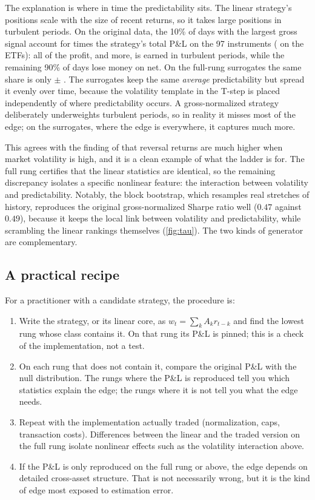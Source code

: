 \documentclass[11pt]{article}
\theoremstyle{definition}
\theoremstyle{remark}
\begin{document}
The explanation is where in time the predictability sits. The linear strategy's positions scale with the size of recent returns, so it takes large positions in turbulent
periods. On the original data, the 10\% of days with the largest gross signal account for \concOrigAll{} times the strategy's total P\&L on the 97 instruments
(\concOrigEtf{} on the ETFs): all of the profit, and more, is earned in turbulent periods, while the remaining 90\% of days lose money on net. On the full-rung surrogates
the same share is only \concSynAll{} $\pm$ \concSynSdAll{}. The surrogates keep the same \emph{average} predictability but spread it evenly over time, because the
volatility template in the T-step is placed independently of where predictability occurs. A gross-normalized strategy deliberately underweights turbulent periods, so in
reality it misses most of the edge; on the surrogates, where the edge is everywhere, it captures much more.

This agrees with the finding of \citet{nagel2012} that reversal returns are much higher when market volatility is high, and it is a clean example of what the ladder is
for. The full rung certifies that the linear statistics are identical, so the remaining discrepancy isolates a specific nonlinear feature: the interaction between
volatility and predictability. Notably, the block bootstrap, which resamples real stretches of history, reproduces the original gross-normalized Sharpe ratio well
($0.47$ against $0.49$), because it keeps the local link between volatility and predictability, while scrambling the linear rankings themselves (\cref{fig:tau}). The two kinds of
generator are complementary.

\subsection{A practical recipe}

For a practitioner with a candidate strategy, the procedure is:
\begin{enumerate}[leftmargin=*,itemsep=2pt]
\item Write the strategy, or its linear core, as $w_t=\sum_k A_kr_{t-k}$ and find the lowest rung whose class contains it. On that rung its P\&L is pinned; this is a check
of the implementation, not a test.
\item On each rung that does not contain it, compare the original P\&L with the null distribution. The rungs where the P\&L is reproduced tell you which statistics explain
the edge; the rungs where it is not tell you what the edge needs.
\item Repeat with the implementation actually traded (normalization, caps, transaction costs). Differences between the linear and the traded version on the full rung isolate
nonlinear effects such as the volatility interaction above.
\item If the P\&L is only reproduced on the full rung or above, the edge depends on detailed cross-asset structure. That is not necessarily wrong, but it is the kind of edge most
exposed to estimation error.
\end{enumerate}
\end{document}

